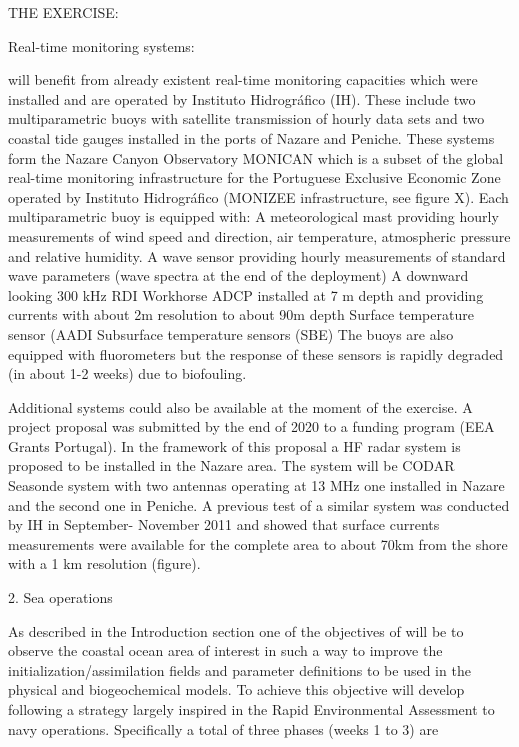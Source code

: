 THE EXERCISE:
 
Real-time monitoring systems:

\proj will benefit from already existent real-time monitoring capacities which were installed and are operated by Instituto Hidrográfico (IH). These include two multiparametric buoys with satellite transmission of hourly data sets and two coastal tide gauges installed in the ports of Nazare and Peniche. These systems form the Nazare Canyon Observatory MONICAN which is a subset of the global real-time monitoring infrastructure for the Portuguese Exclusive Economic Zone operated by Instituto Hidrográfico (MONIZEE infrastructure, see figure X). Each multiparametric buoy is equipped with:
 A meteorological mast providing hourly measurements of wind speed and direction, air temperature, atmospheric pressure and relative humidity.
A wave sensor providing hourly measurements of standard wave parameters (wave spectra at the end of the deployment)
A downward looking 300 kHz RDI Workhorse ADCP installed at 7 m depth and providing currents with about 2m resolution to about 90m depth
Surface temperature sensor (AADI
Subsurface temperature sensors (SBE)
 The buoys are also equipped with fluorometers but the response of these sensors is rapidly degraded (in about 1-2 weeks) due to biofouling.

Additional systems could also be available at the moment of the exercise. A project proposal was submitted by the end of 2020 to a funding program (EEA Grants Portugal). In the framework of this proposal a HF radar system is proposed to be installed in the Nazare area. The system will be CODAR Seasonde system with two antennas operating at 13 MHz one installed in Nazare and the second one in Peniche. A previous test of a similar system was conducted by IH in September- November 2011 and showed that surface currents measurements were available for the complete area to about 70km from the shore with a 1 km resolution (figure).
 
 
 
 
 
 
2. Sea operations
 
As described in the Introduction section one of the objectives of \pro
will be to observe the coastal ocean area of interest in such a way to
improve the initialization/assimilation fields and parameter definitions
to be used in the physical and biogeochemical models. To achieve this
objective \pro will develop following a strategy largely inspired in the
Rapid Environmental Assessment to navy operations.  Specifically a total
of three phases (weeks 1 to 3) are
 
